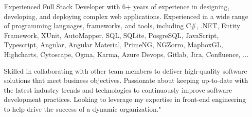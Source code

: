 

\begin{cvparagraph}

Experienced Full Stack Developer with 6+ years of experience in designing, developing, and deploying complex web applications. Experienced in a wide range of programming languages, frameworks, and tools, including C\#, .NET, Entity Framework, XUnit, AutoMapper, SQL, SQLite, PosgreSQL, JavaScript, Typescript, Angular, Angular Material, PrimeNG, NGZorro, MapboxGL, Highcharts, Cytoscape, Ogma, Karma, Azure Devops, Gitlab, Jira, Confluence, ... 

Skilled in collaborating with other team members to deliver high-quality software solutions that meet business objectives. Passionate about keeping up-to-date with the latest industry trends and technologies to continuously improve software development practices. Looking to leverage my expertise in front-end engineering to help drive the success of a dynamic organization."
\end{cvparagraph}
